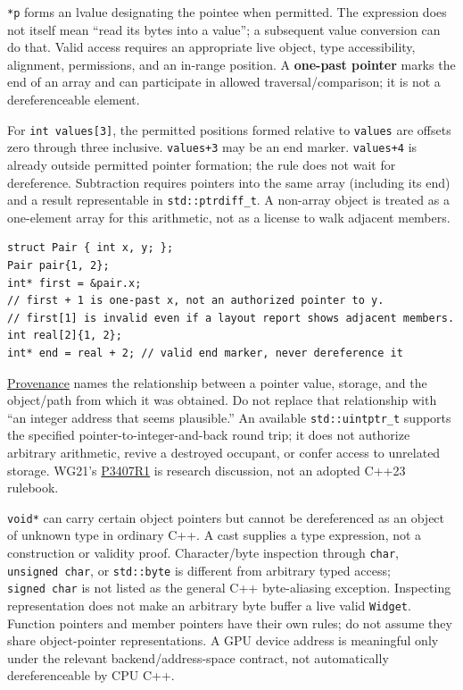 \texttt{*p} forms an lvalue designating the pointee when permitted. The expression does not itself mean ``read its bytes into a value''; a subsequent value conversion can do that. Valid access requires an appropriate live object, type accessibility, alignment, permissions, and an in-range position. A \textbf{one-past pointer} marks the end of an array and can participate in allowed traversal/comparison; it is not a dereferenceable element.

For \texttt{int\ values{[}3{]}}, the permitted positions formed relative to \texttt{values} are offsets zero through three inclusive. \texttt{values+3} may be an end marker. \texttt{values+4} is already outside permitted pointer formation; the rule does not wait for dereference. Subtraction requires pointers into the same array (including its end) and a result representable in \texttt{std::ptrdiff\_t}. A non-array object is treated as a one-element array for this arithmetic, not as a license to walk adjacent members.

\begin{verbatim}
struct Pair { int x, y; };
Pair pair{1, 2};
int* first = &pair.x;
// first + 1 is one-past x, not an authorized pointer to y.
// first[1] is invalid even if a layout report shows adjacent members.
int real[2]{1, 2};
int* end = real + 2; // valid end marker, never dereference it
\end{verbatim}

\hyperref[appendix-6af5921bc853]{Provenance} names the relationship between a pointer value, storage, and the object/path from which it was obtained. Do not replace that relationship with ``an integer address that seems plausible.'' An available \texttt{std::uintptr\_t} supports the specified pointer-to-integer-and-back round trip; it does not authorize arbitrary arithmetic, revive a destroyed occupant, or confer access to unrelated storage. WG21's \href{https://www.open-std.org/jtc1/sc22/wg21/docs/papers/2025/p3407r1.html}{P3407R1} is research discussion, not an adopted C++23 rulebook.

\texttt{void*} can carry certain object pointers but cannot be dereferenced as an object of unknown type in ordinary C++. A cast supplies a type expression, not a construction or validity proof. Character/byte inspection through \texttt{char}, \texttt{unsigned\ char}, or \texttt{std::byte} is different from arbitrary typed access; \texttt{signed\ char} is not listed as the general C++ byte-aliasing exception. Inspecting representation does not make an arbitrary byte buffer a live valid \texttt{Widget}. Function pointers and member pointers have their own rules; do not assume they share object-pointer representations. A GPU device address is meaningful only under the relevant backend/address-space contract, not automatically dereferenceable by CPU C++.

